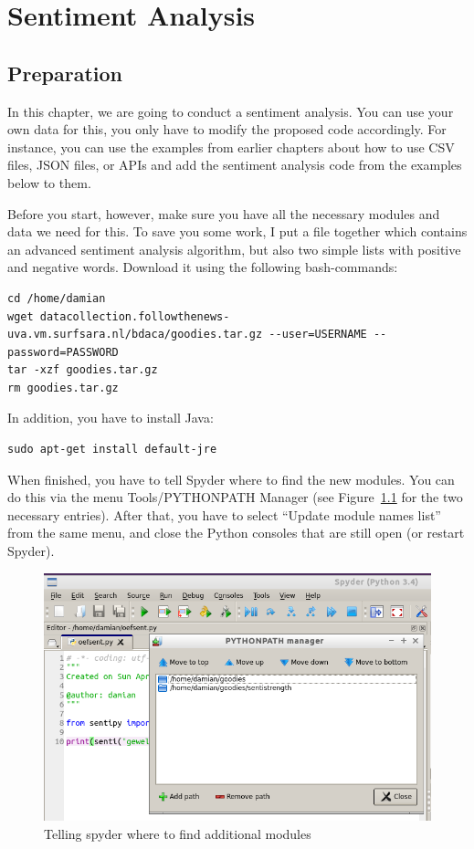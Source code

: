 \documentclass[a4paper,12pt]{book}
\begin{document}
\chapter{Sentiment Analysis}
\label{goodies}
\section{Preparation}
In this chapter, we are going to conduct a sentiment analysis. You can use your own data for this, you only have to modify the proposed code accordingly. For instance, you can use the examples from earlier chapters about how to use CSV files, JSON files, or APIs and add the sentiment analysis code from the examples below to them.

Before you start, however, make sure you have all the necessary modules and data we need for this. To save you some work, I put a file together which contains an advanced sentiment analysis algorithm, but also two simple lists with positive and negative words. Download it using the following bash-commands:

\begin{lstlisting}
cd /home/damian
wget datacollection.followthenews-uva.vm.surfsara.nl/bdaca/goodies.tar.gz --user=USERNAME --password=PASSWORD
tar -xzf goodies.tar.gz
rm goodies.tar.gz
\end{lstlisting}

In addition, you have to install Java:
\begin{lstlisting}
sudo apt-get install default-jre
\end{lstlisting}

When finished, you have to tell Spyder where to find the new modules. You can do this via the menu Tools/PYTHONPATH Manager (see Figure~\ref{fig:pythonpath} for the two necessary entries). After that, you have to select ``Update module names list'' from the same menu, and close the Python consoles that are still open (or restart Spyder).

\begin{figure}[h]
\centering
\includegraphics[width=.8\textwidth, keepaspectratio]{../pictures/pythonpath}
\caption{\label{fig:pythonpath}Telling spyder where to find additional modules}
\end{figure}
\end{document}
